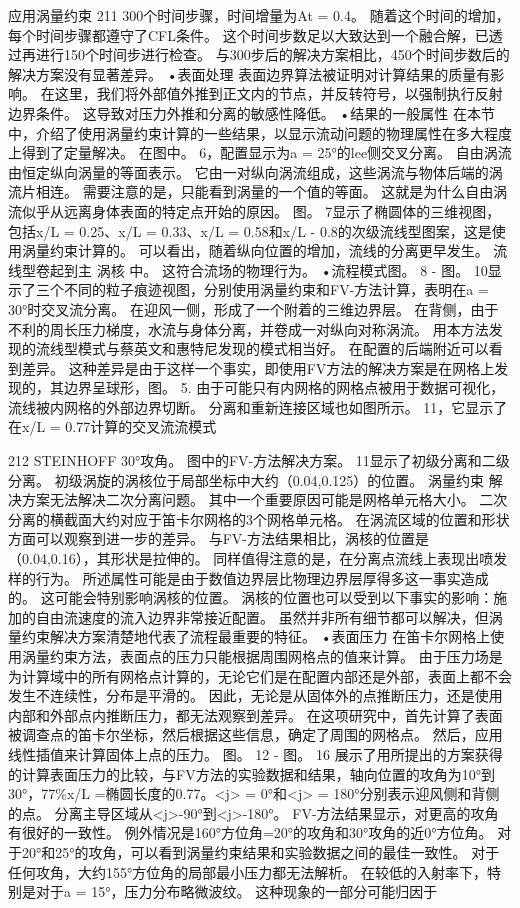 \documentclass[UTF8,11pt,a4paper,openany,fontset=fandol]{ctexbook}
\begin{document}
应用涡量约束 211 300个时间步骤，时间增量为At = 0.4。 随着这个时间的增加，每个时间步骤都遵守了CFL条件。 这个时间步数足以大致达到一个融合解，已透过再进行150个时间步进行检查。 与300步后的解决方案相比，450个时间步数后的解决方案没有显著差异。 •表面处理 表面边界算法被证明对计算结果的质量有影响。 在这里，我们将外部值外推到正文内的节点，并反转符号，以强制执行反射边界条件。 这导致对压力外推和分离的敏感性降低。 •结果的一般属性 在本节中，介绍了使用涡量约束计算的一些结果，以显示流动问题的物理属性在多大程度上得到了定量解决。 在图中。 6，配置显示为a = 25°的lee侧交叉分离。 自由涡流由恒定纵向涡量的等面表示。 它由一对纵向涡流组成，这些涡流与物体后端的涡流片相连。 需要注意的是，只能看到涡量的一个值的等面。 这就是为什么自由涡流似乎从远离身体表面的特定点开始的原因。 图。 7显示了椭圆体的三维视图，包括x/L = 0.25、x/L = 0.33、x/L = 0.58和x/L - 0.8的次级流线型图案，这是使用涡量约束计算的。 可以看出，随着纵向位置的增加，流线的分离更早发生。 流线型卷起到主 涡核 中。 这符合流场的物理行为。 •流程模式图。 8 - 图。 10显示了三个不同的粒子痕迹视图，分别使用涡量约束和FV-方法计算，表明在a = 30°时交叉流分离。 在迎风一侧，形成了一个附着的三维边界层。 在背侧，由于不利的周长压力梯度，水流与身体分离，并卷成一对纵向对称涡流。 用本方法发现的流线型模式与蔡英文和惠特尼发现的模式相当好。 在配置的后端附近可以看到差异。 这种差异是由于这样一个事实，即使用FV方法的解决方案是在网格上发现的，其边界呈球形，图。 5. 由于可能只有内网格的网格点被用于数据可视化，流线被内网格的外部边界切断。 分离和重新连接区域也如图所示。 11，它显示了在x/L = 0.77计算的交叉流流模式

212 STEINHOFF 30°攻角。 图中的FV-方法解决方案。 11显示了初级分离和二级分离。 初级涡旋的涡核位于局部坐标中大约（0.04,0.125）的位置。 涡量约束 解决方案无法解决二次分离问题。 其中一个重要原因可能是网格单元格大小。 二次分离的横截面大约对应于笛卡尔网格的3个网格单元格。 在涡流区域的位置和形状方面可以观察到进一步的差异。 与FV-方法结果相比，涡核的位置是（0.04,0.16），其形状是拉伸的。 同样值得注意的是，在分离点流线上表现出喷发样的行为。 所述属性可能是由于数值边界层比物理边界层厚得多这一事实造成的。 这可能会特别影响涡核的位置。 涡核的位置也可以受到以下事实的影响：施加的自由流速度的流入边界非常接近配置。 虽然并非所有细节都可以解决，但涡量约束解决方案清楚地代表了流程最重要的特征。 •表面压力 在笛卡尔网格上使用涡量约束方法，表面点的压力只能根据周围网格点的值来计算。 由于压力场是为计算域中的所有网格点计算的，无论它们是在配置内部还是外部，表面上都不会发生不连续性，分布是平滑的。 因此，无论是从固体外的点推断压力，还是使用内部和外部点内推断压力，都无法观察到差异。 在这项研究中，首先计算了表面被调查点的笛卡尔坐标，然后根据这些信息，确定了周围的网格点。 然后，应用线性插值来计算固体上点的压力。 图。 12 - 图。 16 展示了用所提出的方案获得的计算表面压力的比较，与FV方法的实验数据和结果，轴向位置的攻角为10°到30°，77\%x/L =椭圆长度的0.77。<j> = 0°和<j> = 180°分别表示迎风侧和背侧的点。 分离主导区域从<j>-90°到<j>-180°。 FV-方法结果显示，对更高的攻角有很好的一致性。 例外情况是160°方位角=20°的攻角和30°攻角的近0°方位角。 对于20°和25°的攻角，可以看到涡量约束结果和实验数据之间的最佳一致性。 对于任何攻角，大约155°方位角的局部最小压力都无法解析。 在较低的入射率下，特别是对于a = 15°，压力分布略微波纹。 这种现象的一部分可能归因于
\end{document}
